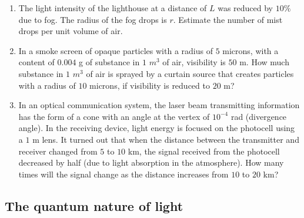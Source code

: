 \documentclass{article}
\begin{document}
\begin{enumerate}[label=13.4.\arabic*]
\item The light intensity of the lighthouse at a distance of $L$ was reduced by $10 \%$ due to fog. The radius of the fog drops is $r$. Estimate the number of mist drops per unit volume of air.

\item In a smoke screen of opaque particles with a radius of $5$ microns, with a content of $0.004$ g of substance in $1$ $m^3$ of air, visibility is $50$ m. How much substance in $1$ $m^3$ of air is sprayed by a curtain source that creates particles with a radius of $10$ microns, if visibility is reduced to $20$ m?

\item In an optical communication system, the laser beam transmitting information has the form of a cone with an angle at the vertex of $10^{-4}$ rad (divergence angle). In the receiving device, light energy is focused on the photocell using a $1$ m lens. It turned out that when the distance between the transmitter and receiver changed from $5$ to $10$ km, the signal received from the photocell decreased by half (due to light absorption in the atmosphere). How many times will the signal change as the distance increases from $10$ to $20$ km?



\end{enumerate}
\subsection{The quantum nature of light}
\end{document}
